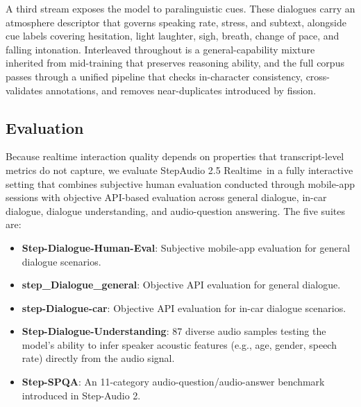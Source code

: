 \documentclass{llmxive}
\providecommand{\steprealtime}{\mbox{StepAudio} 2.5 Realtime}
\begin{document}
A third stream exposes the model to paralinguistic cues. These dialogues carry an atmosphere descriptor that governs speaking rate, stress, and subtext, alongside cue labels covering hesitation, light laughter, sigh, breath, change of pace, and falling intonation. Interleaved throughout is a general-capability mixture inherited from mid-training that preserves reasoning ability, and the full corpus passes through a unified pipeline that checks in-character consistency, cross-validates annotations, and removes near-duplicates introduced by fission.

\subsection{Evaluation}

Because realtime interaction quality depends on properties that transcript-level metrics do not capture, we evaluate \steprealtime\ in a fully interactive setting that combines subjective human evaluation conducted through mobile-app sessions with objective API-based evaluation across general dialogue, in-car dialogue, dialogue understanding, and audio-question answering. The five suites are:
\begin{itemize}
    \item \textbf{Step-Dialogue-Human-Eval}: Subjective mobile-app evaluation for general dialogue scenarios.
    \item \textbf{step\_Dialogue\_general}: Objective API evaluation for general dialogue.
    \item \textbf{step-Dialogue-car}: Objective API evaluation for in-car dialogue scenarios.
    \item \textbf{Step-Dialogue-Understanding}: 87 diverse audio samples testing the model's ability to infer speaker acoustic features (e.g., age, gender, speech rate) directly from the audio signal.
    \item \textbf{Step-SPQA}: An 11-category audio-question/audio-answer benchmark introduced in Step-Audio 2.
\end{itemize}
\end{document}
